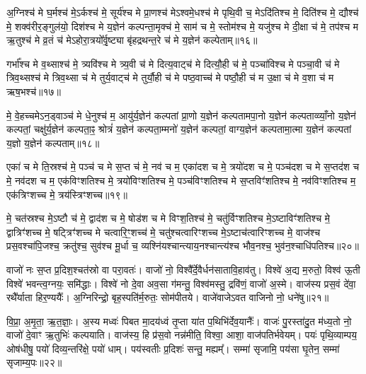 {\anuvakamend[{गृ॒हाश्च॒ षोड॑श च॥८॥}]}

अ॒ग्निश्च॑ मे घ॒र्मश्च॑ मे॒\-ऽर्कश्च॑ मे॒ सूर्य॑श्च मे प्रा॒णश्च॑ मे\-ऽश्वमे॒धश्च॑ मे पृथि॒वी च॒ मे\-ऽदि॑तिश्च मे॒ दिति॑श्च मे॒ द्यौश्च॑ मे॒ शक्व॑रीर॒ङ्गुल॑यो॒ दिश॑श्च मे य॒ज्ञेन॑ कल्पन्ता॒मृक्च॑ मे॒ साम॑ च मे॒ स्तोम॑श्च मे॒ यजु॑श्च मे दी॒क्षा च॑ मे॒ तप॑श्च म ऋ॒तुश्च॑ मे व्र॒तं च॑ मे\-ऽहोरा॒त्रयो᳚र्वृ॒ष्ट्या बृ॑हद्रथन्त॒रे च॑ मे य॒ज्ञेन॑ कल्पेताम्॥१६॥

{\anuvakamend[{दी॒क्षा\-ऽष्टाद॑श च॥९॥}]}

गर्भा᳚श्च मे व॒थ्साश्च॑ मे॒ त्र्यवि॑श्च मे त्र्य॒वी च॑ मे दित्य॒वाट्च॑ मे दित्यौ॒ही च॑ मे॒ पञ्चा॑विश्च मे पञ्चा॒वी च॑ मे त्रिव॒थ्सश्च॑ मे त्रिव॒थ्सा च॑ मे तुर्य॒वाट्च॑ मे तुर्यौ॒ही च॑ मे पष्ठ॒वाच्च॑ मे पष्ठौ॒ही च॑ म उ॒क्षा च॑ मे व॒शा च॑ म ऋष॒भश्च॑॥१७॥

मे॒ वे॒हच्चमे\-ऽन॒ड्वाञ्च॑ मे धे॒नुश्च॑ म॒ आयु॑र्य॒ज्ञेन॑ कल्पतां प्रा॒णो य॒ज्ञेन॑ कल्पतामपा॒नो य॒ज्ञेन॑ कल्पताव्व्याँ॒नो य॒ज्ञेन॑ कल्पतां॒ चक्षु॑र्य॒ज्ञेन॑ कल्पता॒ꣴ॒ श्रोत्रं॑ य॒ज्ञेन॑ कल्पता॒म्मनो॑ य॒ज्ञेन॑ कल्पतां॒ वाग्य॒ज्ञेन॑ कल्पतामा॒त्मा य॒ज्ञेन॑ कल्पतां य॒ज्ञो य॒ज्ञेन॑ कल्पताम्॥१८॥

{\anuvakamend[{ऋ॒ष॒भश्च॑ चत्वारि॒ꣳ॒शच्च॑॥10॥}]}

एका॑ च मे ति॒स्रश्च॑ मे॒ पञ्च॑ च मे स॒प्त च॑ मे॒ नव॑ च म॒ एका॑दश च मे॒ त्रयो॑दश च मे॒ पञ्च॑दश च मे स॒प्तद॑श च मे॒ नव॑दश च म॒ एक॑विꣳशतिश्च मे॒ त्रयो॑विꣳशतिश्च मे॒ पञ्च॑विꣳशतिश्च मे स॒प्तविꣳ॑शतिश्च मे॒ नव॑विꣳशतिश्च म॒ एक॑त्रिꣳशच्च मे॒ त्रय॑स्त्रिꣳशच्च॥१९॥

मे॒ चत॑स्रश्च मे॒\-ऽष्टौ च॑ मे॒ द्वाद॑श च मे॒ षोड॑श च मे विꣳश॒तिश्च॑ मे॒ चतु॑र्विꣳशतिश्च मे॒\-ऽष्टाविꣳ॑शतिश्च मे॒ द्वात्रिꣳ॑शच्च मे॒ षट्त्रिꣳ॑शच्च मे चत्वारि॒ꣳ॒शच्च॑ मे॒ चतु॑श्चत्वारिꣳशच्च मे॒\-ऽष्टाच॑त्वारिꣳशच्च मे॒ वाज॑श्च प्रस॒वश्चा॑पि॒जश्च॒ क्रतु॑श्च॒ सुव॑श्च मू॒र्धा च॒ व्यश्नि॑यश्चान्त्याय॒नश्चान्त्य॑श्च भौव॒नश्च॒ भुव॑न॒श्चाधि॑पतिश्च॥२०॥

{\anuvakamend[{त्रय॑स्त्रिꣳशच्च॒ व्यश्ञि॑य॒ एका॑दश च॥11॥}]}

वाजो॑ नः स॒प्त प्र॒दिश॒श्चत॑स्रो वा परा॒वतः॑। वाजो॑ नो॒ विश्वै᳚र्दे॒वैर्धन॑सातावि॒हाव॑तु। विश्वे॑ अ॒द्य म॒रुतो॒ विश्व॑ ऊ॒ती विश्वे॑ भवन्त्व॒ग्नयः॒ समि॑द्धाः। विश्वे॑ नो दे॒वा अव॒सा ग॑मन्तु॒ विश्व॑मस्तु॒ द्रवि॑णं॒ वाजो॑ अ॒स्मे। वाज॑स्य प्रस॒वं दे॑वा॒ रथै᳚र्याता हिर॒ण्ययैः᳚। अ॒ग्निरिन्द्रो॒ बृह॒स्पति॑र्म॒रुतः॒ सोम॑पीतये। वाजे॑वाजे\-ऽवत वाजिनो नो॒ धने॑षु॥२१॥

वि॒प्रा॒ अ॒मृ॒ता॒ ऋ॒त॒ज्ञाः॒। अ॒स्य मध्वः॑ पिबत मा॒दय॑ध्वं तृ॒प्ता या॑त प॒थिभि॑र्देव॒यानैः᳚। वाजः॑ पु॒रस्ता॑दु॒त म॑ध्य॒तो नो॒ वाजो॑ दे॒वाꣳ ऋ॒तुभिः॑ कल्पयाति। वाज॑स्य॒ हि प्र॑स॒वो नन्न॑मीति॒ विश्वा॒ आशा॒ वाज॑पतिर्भवेयम्। पयः॑ पृथि॒व्याम्पय॒ ओष॑धीषु॒ पयो॑ दिव्य॒न्तरि॑क्षे॒ पयो॑ धाम्। पय॑स्वतीः प्र॒दिशः॑ सन्तु॒ मह्यम्᳚। सम्मा॑ सृजामि॒ पय॑सा घृ॒तेन॒ सम्मा॑ सृजाम्य॒पः॥२२॥

